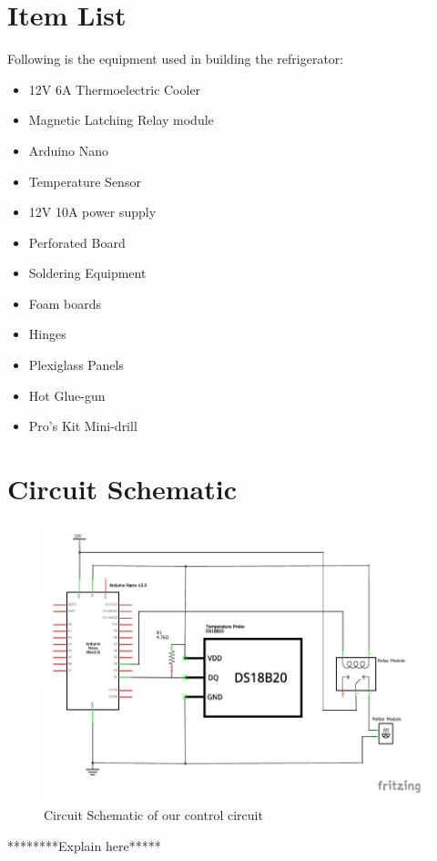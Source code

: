 \documentclass[12pt,a4paper]{report}
\begin{document}
\section{Item List}
Following is the equipment used in building the refrigerator:
\begin{itemize}\itemsep -2pt
\item 12V 6A Thermoelectric Cooler
\item Magnetic Latching Relay module
\item Arduino Nano
\item Temperature Sensor
\item 12V 10A power supply
\item Perforated Board
\item Soldering Equipment
\item Foam boards
\item Hinges
\item Plexiglass Panels
\item Hot Glue-gun
\item Pro's Kit Mini-drill
\end{itemize}

\section{Circuit Schematic}
\begin{figure}[!h]
	\centering
	\includegraphics[scale=1.0]{mini_fridge_schem}
	\caption{Circuit Schematic of our control circuit}
\end{figure}
********Explain here*****
\end{document}
